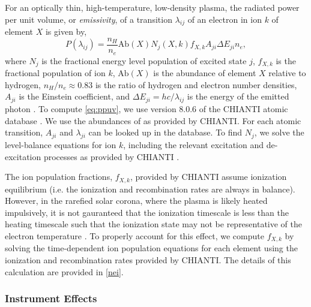 For an optically thin, high-temperature, low-density plasma, the radiated power per unit volume, or \textit{emissivity}, of a transition $\lambda_{ij}$ of an electron in ion $k$ of element $X$ is given by,
\begin{equation}
    \label{eq:ppuv}
    P(\lambda_{ij}) = \frac{n_H}{n_e}\mathrm{Ab}(X)N_j(X,k)f_{X,k}A_{ji}\Delta E_{ji}n_e,
\end{equation}
where $N_j$ is the fractional energy level population of excited state $j$, $f_{X,k}$ is the fractional population of ion $k$, $\mathrm{Ab}(X)$ is the abundance of element $X$ relative to hydrogen, $n_H/n_e\approx0.83$ is the ratio of hydrogen and electron number densities, $A_{ji}$ is the Einstein coefficient, and $\Delta E_{ji}=hc/\lambda_{ij}$ is the energy of the emitted photon \citep[see][]{mason_spectroscopic_1994,del_zanna_solar_2018}. To compute \autoref{eq:ppuv}, we use version 8.0.6 of the CHIANTI atomic database \citep{dere_chianti_1997,young_chianti_2016}. We use the abundances of \citet{feldman_potential_1992} as provided by CHIANTI. For each atomic transition, $A_{ji}$ and $\lambda_{ji}$ can be looked up in the database. To find $N_j$, we solve the level-balance equations for ion $k$, including the relevant excitation and de-excitation processes as provided by CHIANTI \citep[see section 3.3 of][]{del_zanna_solar_2018}.

The ion population fractions, $f_{X,k}$, provided by CHIANTI assume ionization equilibrium (i.e. the ionization and recombination rates are always in balance). However, in the rarefied solar corona, where the plasma is likely heated impulsively, it is not gauranteed that the ionization timescale is less than the heating timescale such that the ionization state may not be representative of the electron temperature \citep{bradshaw_explosive_2006,reale_nonequilibrium_2008,bradshaw_numerical_2009}. To properly account for this effect, we compute $f_{X,k}$ by solving the time-dependent ion population equations for each element using the ionization and recombination rates provided by CHIANTI. The details of this calculation are provided in \autoref{nei}.

\subsubsection{Instrument Effects}\label{instrument}

